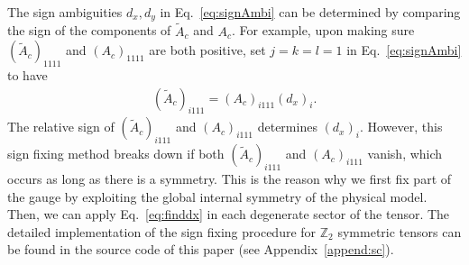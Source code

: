 \documentclass[aps,prr,reprint,superscriptaddress,nofootinbib,floatfix]{revtex4-2}
\begin{document}
The sign ambiguities $d_x,d_y$ in Eq.~\eqref{eq:signAmbi} can be determined by comparing the sign of the components of $\tilde{A}_c$ and $A_c$.
For example, upon making sure $(\tilde{A}_c)_{1111}$ and $(A_c)_{1111}$ are both positive, set $j = k = l = 1$ in Eq.~\eqref{eq:signAmbi} to have
%
\begin{align}\label{eq:finddx}
    (\tilde{A}_c)_{i111} =
    (A_c)_{i111}(d_x)_i. 
\end{align}
%
The relative sign of $(\tilde{A}_c)_{i111}$ and $(A_c)_{i111}$ determines $(d_x)_i$.
However, this sign fixing method breaks down if both $(\tilde{A}_c)_{i111}$ and $(A_c)_{i111}$ vanish, which occurs as long as there is a symmetry.
This is the reason why we first fix part of the gauge by exploiting the global internal symmetry of the physical model.
Then, we can apply Eq.~\eqref{eq:finddx} in each degenerate sector of the tensor.
The detailed implementation of the sign fixing procedure for $\mathbb{Z}_2$ symmetric tensors can be found in the source code of this paper (see Appendix~\ref{append:sc}).
%
\end{document}
